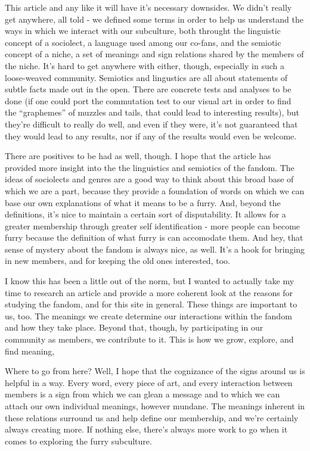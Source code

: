 This article and any like it will have it's necessary downsides. We didn't really get anywhere, all told - we defined some terms in order to help us understand the ways in which we interact with our subculture, both throught the linguistic concept of a sociolect, a language used among our co-fans, and the semiotic concept of a niche, a set of meanings and sign relations shared by the members of the niche. It's hard to get anywhere with either, though, especially in such a loose-weaved community. Semiotics and lingustics are all about statements of subtle facts made out in the open. There are concrete tests and analyses to be done (if one could port the commutation test to our visual art in order to find the ``graphemes'' of muzzles and tails, that could lead to interesting results), but they're difficult to really do well, and even if they were, it's not guaranteed that they would lead to any results, nor if any of the results would even be welcome.

There are positives to be had as well, though. I hope that the article has provided more insight into the the linguistics and semiotics of the fandom. The ideas of sociolects and genres are a good way to think about this broad base of which we are a part, because they provide a foundation of words on which we can base our own explanations of what it means to be a furry. And, beyond the definitions, it's nice to maintain a certain sort of disputability. It allows for a greater membership through greater self identification - more people can become furry because the definition of what furry is can accomodate them. And hey, that sense of mystery about the fandom is always nice, as well. It's a hook for bringing in new members, and for keeping the old ones interested, too.

I know this has been a little out of the norm, but I wanted to actually take my time to research an article and provide a more coherent look at the reasons for studying the fandom, and for this site in general. These things are important to us, too. The meanings we create determine our interactions within the fandom and how they take place. Beyond that, though, by participating in our community as members, we contribute to it. This is how we grow, explore, and find meaning,

Where to go from here? Well, I hope that the cognizance of the signs around us is helpful in a way. Every word, every piece of art, and every interaction between members is a sign from which we can glean a message and to which we can attach our own individual meanings, however mundane. The meanings inherent in these relations surround us and help define our membership, and we're certainly always creating more. If nothing else, there's always more work to go when it comes to exploring the furry subculture.

